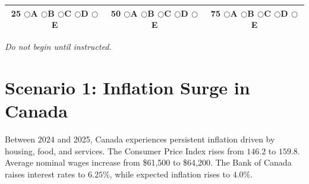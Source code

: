 \documentclass[12pt]{article}
\begin{document}
\begin{titlepage}
\begin{center}
\begin{tabular}{ccc}
25 \quad $\bigcirc$A $\bigcirc$B $\bigcirc$C $\bigcirc$D $\bigcirc$E &
50 \quad $\bigcirc$A $\bigcirc$B $\bigcirc$C $\bigcirc$D $\bigcirc$E &
75 \quad $\bigcirc$A $\bigcirc$B $\bigcirc$C $\bigcirc$D $\bigcirc$E \\

\bottomrule
\end{tabular}
\end{center}

\vfill

\begin{center}
\textit{Do not begin until instructed.}
\end{center}

\end{titlepage}





\section*{Scenario 1: Inflation Surge in Canada}

Between 2024 and 2025, Canada experiences persistent inflation driven by housing, food, and services. The Consumer Price Index rises from \(146.2\) to \(159.8\). Average nominal wages increase from \$61,500 to \$64,200. The Bank of Canada raises interest rates to \(6.25\%\), while expected inflation rises to \(4.0\%\).
\end{document}
